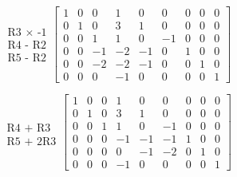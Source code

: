 \documentclass[a4paper]{report}
\begin{document}
\begin{equation*}
\begin{matrix}
\\
\\
\text{R3 $\times$ -1} \\
\text{R4 - R2} \\
\text{R5 - R2} \\
\\
\end{matrix}
\begin{bmatrix}
1  &  0  &  0  &  1  &  0  &  0  &  0  &  0  &  0 \\
0  &  1  &  0  &  3  &  1  &  0  &  0  &  0  &  0 \\
0  &  0  &  1  &  1  &  0  & -1  &  0  &  0  &  0 \\
0  &  0  & -1  & -2  & -1  &  0  &  1  &  0  &  0 \\
0  &  0  & -2  & -2  & -1  &  0  &  0  &  1  &  0 \\
0  &  0  &  0  & -1  &  0  &  0  &  0  &  0  &  1
\end{bmatrix}
\end{equation*}

\begin{equation*}
\begin{matrix}
\\
\\
\\
\text{R4 + R3} \\
\text{R5 + 2R3} \\
\\
\end{matrix}
\begin{bmatrix}
1  &  0  &  0  &  1  &  0  &  0  &  0  &  0  &  0 \\
0  &  1  &  0  &  3  &  1  &  0  &  0  &  0  &  0 \\
0  &  0  &  1  &  1  &  0  & -1  &  0  &  0  &  0 \\
0  &  0  &  0  & -1  & -1  & -1  &  1  &  0  &  0 \\
0  &  0  &  0  &  0  & -1  & -2  &  0  &  1  &  0 \\
0  &  0  &  0  & -1  &  0  &  0  &  0  &  0  &  1
\end{bmatrix}
\end{equation*}
\end{document}
